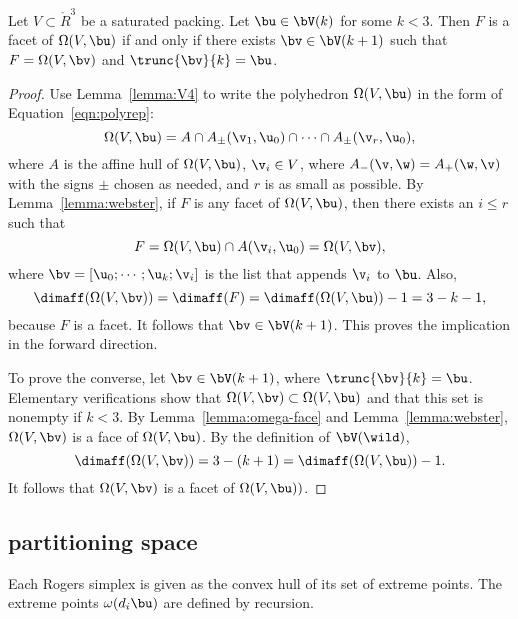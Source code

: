 \begin{lemma}[facets]\label{lemma:omega-facet} 
  Let $V\subset\ring{R}^3$ be a saturated packing.  Let $\bu\in
  \bV(k)$ for some $k<3$.  Then $F$ is a facet of $\Omega(V,\bu)$ if
  and only if there exists $\bv\in \bV(k+1)$ such that $F =
  \Omega(V,\bv)$ and $\trunc{\bv}{k} = \bu$.
\end{lemma}

\begin{proof} 
  Use Lemma~\ref{lemma:V4} to write the polyhedron $\Omega(V,\bu)$ in
  the form of Equation~\ref{eqn:polyrep}:
\[  
\Omega(V,\bu) = A \cap A_\pm(\v_1,\u_0) \cap \cdots\cap A_\pm(\v_r,\u_0),
\] 
where $A$ is the affine hull of $\Omega(V,\bu)$, $\v_i\in V$, where
$A_-(\v,\w) = A_+(\w,\v)$ with the signs $\pm$ chosen as needed, and
$r$ is as small as possible.  By Lemma~\ref{lemma:webster}, if $F$ is
any facet of $\Omega(V,\bu)$, then there exists an $i\le r$ such that
\[  
F = \Omega(V,\bu) \cap A(\v_i,\u_0) = \Omega(V,\bv),
\] 
where $\bv = [\u_0;\cdots;\u_k;\v_i]$ is the list that appends $\v_i$ to $\bu$.
Also, 
\[  
\dimaff(\Omega(V,\bv)) = \dimaff(F) = \dimaff(\Omega(V,\bu)) - 1 = 3 - k - 1,
\] 
because $F$ is a facet.
It follows that $\bv \in \bV(k+1)$.  This proves the implication in the forward direction.

To prove the converse, let $\bv\in \bV(k+1)$, where $\trunc{\bv}{k} =
\bu$.  Elementary verifications show that $\Omega(V,\bv)\subset
\Omega(V,\bu)$ and that this set is nonempty if $k<3$.  By
Lemma~\ref{lemma:omega-face} and Lemma~\ref{lemma:webster},
$\Omega(V,\bv)$ is a face of $\Omega(V,\bu)$.  By the definition of
$\bV(\wild )$,
\[  
\dimaff(\Omega(V,\bv)) = 3 - (k+1) = \dimaff(\Omega(V,\bu)) -1.
\] 
It follows that $\Omega(V,\bv)$ is a facet of $\Omega(V,\bu))$.
\end{proof}


\subsection{partitioning space}

Each Rogers simplex is given as the convex hull of  its set of extreme points.  
The extreme points $\omega(d_i\bu)$
are defined by recursion.

